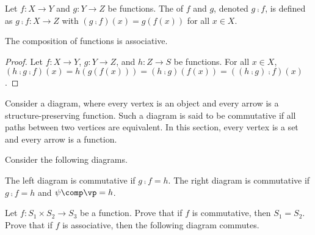 \documentclass[10pt]{article}
\begin{document}
\begin{definition}
    Let $f:X\to Y$ and $g:Y\to Z$ be functions. The  of $f$ and $g$, denoted $g\comp f$, is defined as $g\comp f:X\to Z$ with $(g\comp f)(x)=g(f(x))$ for all $x\in X$.
\end{definition}
\begin{proposition}
    The composition of functions is associative.
\end{proposition}
\begin{proof}
    Let $f:X\to Y$, $g:Y\to Z$, and $h:Z\to S$ be functions. For all $x\in X$, $(h\comp g\comp f)(x)=h(g(f(x)))=(h\comp g)(f(x))=((h\comp g)\comp f)(x)$.
\end{proof}
\par
Consider a diagram, where every vertex is an object and every arrow is a structure-preserving function. Such a diagram is said to be commutative if all paths between two vertices are equivalent. In this section, every vertex is a set and every arrow is a function.
\begin{example}
    Consider the following diagrams.
    \begin{center}
        \hspace{3cm}
    \end{center}
    The left diagram is commutative if $g\comp f=h$. The right diagram is commutative if $g\comp f=h$ and $\psi\comp\vp=h$.
\end{example}
\begin{problem}
    Let $f:{S}_{1}\times{S}_{2}\to{S}_{3}$ be a function. Prove that if $f$ is commutative, then ${S}_{1}={S}_{2}$. Prove that if $f$ is associative, then the following diagram commutes.
    \begin{center}
    \end{center}
\end{problem}
\end{document}
